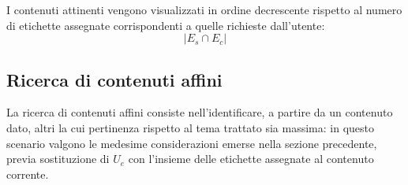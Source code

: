 \documentclass[10pt,a4paper,headinclude,footinclude,hidelinks]{scrreprt} %
\begin{document}
	I contenuti attinenti vengono visualizzati in ordine decrescente rispetto al numero di etichette assegnate corrispondenti a quelle richieste dall'utente:
	$$\left|{E_s \cap E_c}\right|$$
	\subsection{Ricerca di contenuti affini}
	La ricerca di contenuti affini consiste nell'identificare, a partire da un contenuto dato, altri la cui pertinenza rispetto al tema trattato sia massima: in questo scenario valgono le medesime considerazioni emerse nella sezione precedente, previa sostituzione di $U_e$ con l'insieme delle etichette assegnate al contenuto corrente.
	

\end{document}
